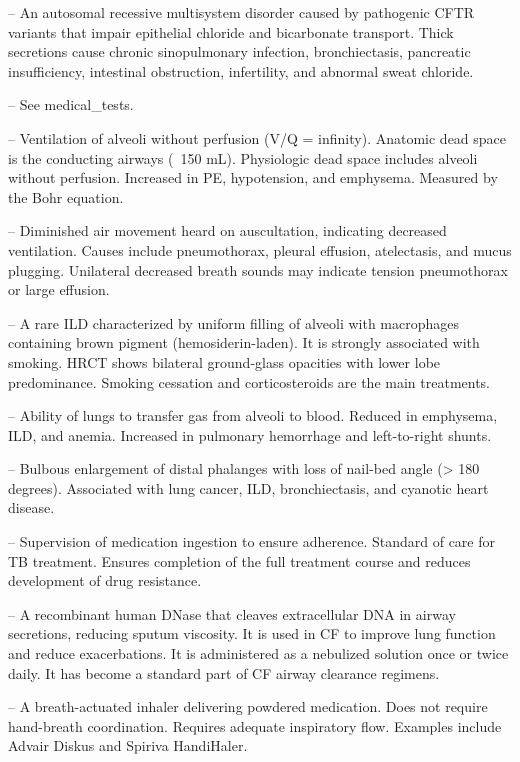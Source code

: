 -- An autosomal recessive multisystem disorder caused by pathogenic CFTR variants that impair epithelial chloride and bicarbonate transport. Thick secretions cause chronic sinopulmonary infection, bronchiectasis, pancreatic insufficiency, intestinal obstruction, infertility, and abnormal sweat chloride.

-- See medical\_tests.

-- Ventilation of alveoli without perfusion (V/Q = infinity). Anatomic dead space is the conducting airways (~150 mL). Physiologic dead space includes alveoli without perfusion. Increased in PE, hypotension, and emphysema. Measured by the Bohr equation.

-- Diminished air movement heard on auscultation, indicating decreased ventilation. Causes include pneumothorax, pleural effusion, atelectasis, and mucus plugging. Unilateral decreased breath sounds may indicate tension pneumothorax or large effusion.

-- A rare ILD characterized by uniform filling of alveoli with macrophages containing brown pigment (hemosiderin-laden). It is strongly associated with smoking. HRCT shows bilateral ground-glass opacities with lower lobe predominance. Smoking cessation and corticosteroids are the main treatments.

-- Ability of lungs to transfer gas from alveoli to blood. Reduced in emphysema, ILD, and anemia. Increased in pulmonary hemorrhage and left-to-right shunts.

-- Bulbous enlargement of distal phalanges with loss of nail-bed angle (> 180 degrees). Associated with lung cancer, ILD, bronchiectasis, and cyanotic heart disease.

-- Supervision of medication ingestion to ensure adherence. Standard of care for TB treatment. Ensures completion of the full treatment course and reduces development of drug resistance.

-- A recombinant human DNase that cleaves extracellular DNA in airway secretions, reducing sputum viscosity. It is used in CF to improve lung function and reduce exacerbations. It is administered as a nebulized solution once or twice daily. It has become a standard part of CF airway clearance regimens.

-- A breath-actuated inhaler delivering powdered medication. Does not require hand-breath coordination. Requires adequate inspiratory flow. Examples include Advair Diskus and Spiriva HandiHaler.


